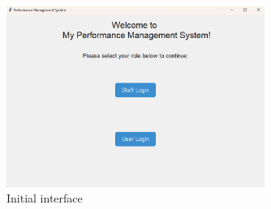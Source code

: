\documentclass[12pt]{article}
\begin{document}
\begin{figure}[H]
    \centering
    \includegraphics[width=0.75\textwidth]{3.png}
    \caption{Initial interface}
    \label{Figure 3}
\end{figure}
\end{document}

